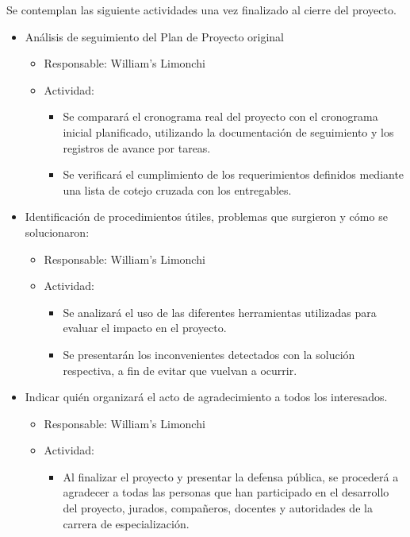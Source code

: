 \documentclass[
11pt, %
]{charter}
\begin{document}
Se contemplan las siguiente actividades una vez finalizado al cierre del proyecto.

\begin{itemize}
	\item Análisis de seguimiento del Plan de Proyecto original
	\begin{itemize}
		\item Responsable: William’s Limonchi
		\item Actividad: 
		\begin{itemize}
			\item Se comparará el cronograma real del proyecto con el cronograma inicial planificado, utilizando la documentación de seguimiento y los registros de avance por tareas.
			\item Se verificará el cumplimiento de los requerimientos definidos mediante una lista de cotejo cruzada con los entregables.
		\end{itemize}
	\end{itemize}
	\item Identificación de procedimientos útiles, problemas que surgieron y cómo se solucionaron:
	\begin{itemize}
		\item Responsable: William’s Limonchi
		\item Actividad: 
		\begin{itemize}
			\item Se analizará el uso de las diferentes herramientas utilizadas para evaluar el
			impacto en el proyecto.
			\item Se presentarán los inconvenientes detectados con la solución respectiva, a fin de
			evitar que vuelvan a ocurrir.
		\end{itemize}
	\end{itemize}
	\item Indicar quién organizará el acto de agradecimiento a todos los interesados.
	\begin{itemize}
		\item Responsable: William’s Limonchi
		\item Actividad: 
		\begin{itemize}
			\item Al finalizar el proyecto y presentar la defensa pública, se procederá a agradecer
			a todas las personas que han participado en el desarrollo del proyecto, jurados,
			compañeros, docentes y autoridades de la carrera de especialización.
		\end{itemize}
	\end{itemize}
\end{itemize}
\end{document}
